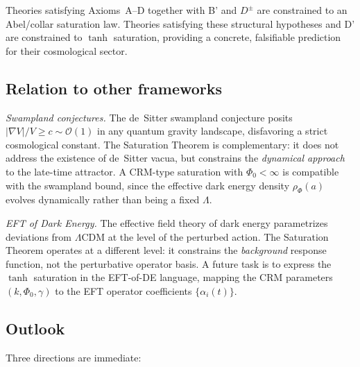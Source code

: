 \documentclass[aps,prd,twocolumn,superscriptaddress,nofootinbib]{revtex4-2}
\begin{document}
Theories satisfying Axioms~A--D together with B' and $D^\pm$ are constrained to an Abel/collar saturation law. Theories satisfying these structural hypotheses and D' are constrained to $\tanh$ saturation, providing a concrete, falsifiable prediction for their cosmological sector.

\subsection{Relation to other frameworks}

\textit{Swampland conjectures.} The de~Sitter swampland conjecture \cite{Obied2018} posits $|\nabla V|/V \geq c \sim \mathcal{O}(1)$ in any quantum gravity landscape, disfavoring a strict cosmological constant. The Saturation Theorem is complementary: it does not address the existence of de~Sitter vacua, but constrains the \textit{dynamical approach} to the late-time attractor. A CRM-type saturation with $\Phi_0 < \infty$ is compatible with the swampland bound, since the effective dark energy density $\rho_\Phi(a)$ evolves dynamically rather than being a fixed $\Lambda$.

\textit{EFT of Dark Energy.} The effective field theory of dark energy \cite{Gubitosi2013} parametrizes deviations from $\Lambda$CDM at the level of the perturbed action. The Saturation Theorem operates at a different level: it constrains the \textit{background} response function, not the perturbative operator basis. A future task is to express the $\tanh$ saturation in the EFT-of-DE language, mapping the CRM parameters $(k, \Phi_0, \gamma)$ to the EFT operator coefficients $\{\alpha_i(t)\}$.

\subsection{Outlook}

Three directions are immediate:
\end{document}
